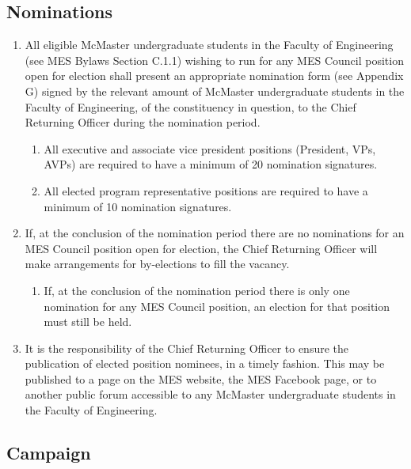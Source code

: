 \subsection{Nominations}
\label{nominations}
\begin{enumerate}
 \item
  All eligible McMaster undergraduate students in the Faculty of Engineering (see MES Bylaws Section C.1.1) wishing to run for any MES Council position open for election shall present an appropriate nomination form (see Appendix G) signed by the relevant amount of McMaster undergraduate students in the Faculty of Engineering, of the constituency in question, to the Chief Returning Officer during the nomination period.
  \begin{enumerate}
   \item
    All executive and associate vice president positions (President, VPs, AVPs) are required to have a minimum of 20 nomination signatures.
   \item
    All elected program representative positions are required to have a minimum of 10 nomination signatures.
  \end{enumerate}
 \item
  If, at the conclusion of the nomination period there are no nominations for an MES Council position open for election, the Chief Returning Officer will make arrangements for by-elections to fill the vacancy.

  \begin{enumerate}
   \item
    If, at the conclusion of the nomination period there is only one nomination for any MES Council position, an election for that position must still be held.
  \end{enumerate}
 \item
  It is the responsibility of the Chief Returning Officer to ensure the publication of elected position nominees, in a timely fashion. This may be published to a page on the MES website, the MES Facebook page, or to another public forum accessible to any McMaster undergraduate students in the Faculty of Engineering.

\end{enumerate}

\subsection{Campaign}
\label{campaign}

